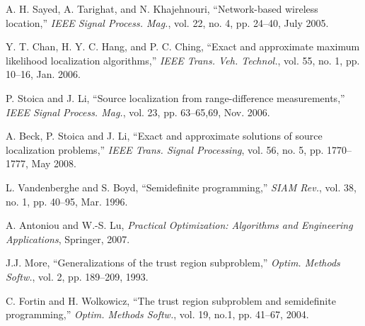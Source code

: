 \begin{frame} [t,allowframebreaks]
\begin{thebibliography}{99}
A. H. Sayed, A. Tarighat, and N. Khajehnouri, ``Network-based wireless location,'' {\em IEEE Signal Process. Mag.}, vol. 22, no. 4, pp. 24--40, July 2005.

Y. T. Chan, H. Y. C. Hang, and P. C. Ching, ``Exact and approximate maximum likelihood localization algorithms,'' {\em IEEE Trans. Veh. Technol.}, vol. 55, no. 1, pp. 10--16, Jan. 2006.

P. Stoica and J. Li, ``Source localization from range-difference measurements,'' {\em IEEE Signal Process. Mag.}, vol. 23, pp. 63--65,69, Nov. 2006.

A. Beck, P. Stoica and J. Li,  ``Exact and approximate solutions of source localization problems,'' {\em IEEE Trans. Signal Processing}, vol. 56, no. 5, pp. 1770--1777, May 2008.

L. Vandenberghe and S. Boyd, ``Semidefinite programming,'' {\em SIAM Rev.}, vol. 38, no. 1, pp. 40--95, Mar. 1996.

A. Antoniou and W.-S. Lu, {\em Practical Optimization: Algorithms and Engineering Applications}, Springer, 2007.

J.J. More, ``Generalizations of the trust region subproblem,'' {\em Optim. Methods Softw.}, vol. 2, pp. 189--209, 1993.

C. Fortin and H. Wolkowicz, ``The trust region subproblem and semidefinite programming,'' {\em Optim. Methods Softw.}, vol. 19, no.1, pp. 41--67, 2004.

\end{thebibliography}


\end{frame}